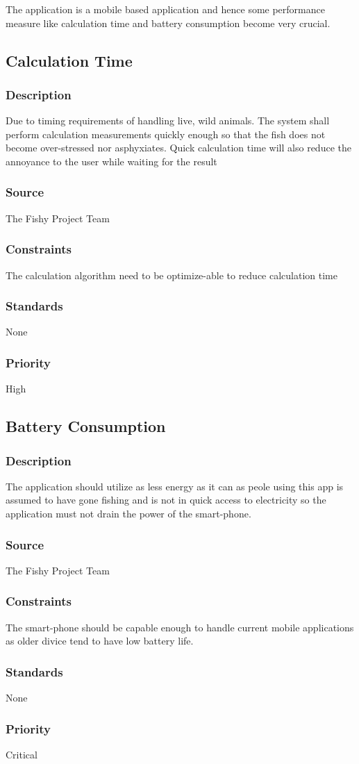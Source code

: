 The application is a mobile based application and hence some performance measure like calculation time and battery consumption become very crucial.

\subsection{Calculation Time}
\subsubsection{Description}
Due to timing requirements of handling live, wild animals. The system shall perform calculation measurements quickly enough so that the fish does not become over-stressed nor asphyxiates. Quick calculation time will also reduce the annoyance to the user while waiting for the result
\subsubsection{Source}
The Fishy Project Team
\subsubsection{Constraints}
The calculation algorithm need to be optimize-able to reduce calculation time
\subsubsection{Standards}
None
\subsubsection{Priority}
High\\

\subsection{Battery Consumption}
\subsubsection{Description}
The application should utilize as less energy as it can as peole using this app is assumed to have gone fishing and is not in quick access to electricity so the application must not drain the power of the smart-phone.
\subsubsection{Source}
The Fishy Project Team
\subsubsection{Constraints}
The smart-phone should be capable enough to handle current mobile applications as older divice tend to have low battery life.
\subsubsection{Standards}
None
\subsubsection{Priority}
Critical